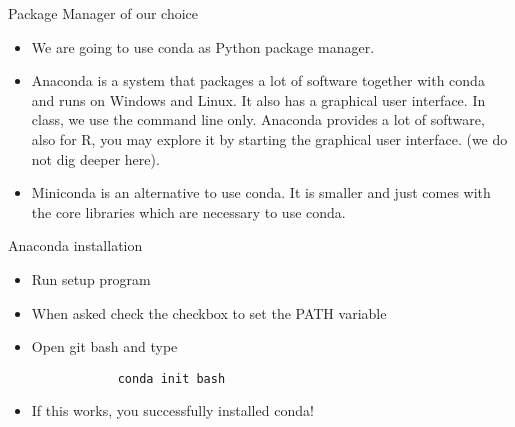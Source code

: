 \begin{frame}{Package Manager of our choice}
	
	\begin{itemize}
		\item We are going to use conda as Python package manager. 
		\item Anaconda is a system that packages a lot of software together with conda and runs on Windows and Linux. It also has a graphical user interface. In class, we use the command line only. Anaconda provides a lot of software, also for R, you may explore it by starting the graphical user interface. (we do not dig deeper here).
		\item Miniconda is an alternative to use conda. It is smaller and just comes with the core libraries which are necessary to use conda.
		
	\end{itemize}
	
	
\end{frame}

\begin{frame}[fragile]{Anaconda installation}
		
		\begin{itemize}
		\item Run setup program
		\item When asked check the checkbox to set the PATH variable
		\item Open git bash and type
		
		\begin{verbatim}
			conda init bash
		\end{verbatim}
		\item If this works, you successfully installed conda!
		
		\end{itemize}
		
\end{frame}

